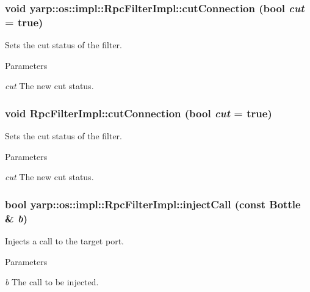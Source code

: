 \hypertarget{classyarp_1_1os_1_1impl_1_1_rpc_filter_impl_ae5de0a409d788cb9f1c910adb586c32c}{
\subsubsection[{cutConnection}]{\setlength{\rightskip}{0pt plus 5cm}void yarp::os::impl::RpcFilterImpl::cutConnection (bool {\em cut} = {\ttfamily true})}}
\label{classyarp_1_1os_1_1impl_1_1_rpc_filter_impl_ae5de0a409d788cb9f1c910adb586c32c}
Sets the cut status of the filter. 
\begin{DoxyParams}{Parameters}
\item[{\em cut}]The new cut status. \end{DoxyParams}
\hypertarget{classyarp_1_1os_1_1impl_1_1_rpc_filter_impl_a3c3f3382e223f75955459fc29bbd9e3d}{
\subsubsection[{cutConnection}]{\setlength{\rightskip}{0pt plus 5cm}void RpcFilterImpl::cutConnection (bool {\em cut} = {\ttfamily true})}}
\label{classyarp_1_1os_1_1impl_1_1_rpc_filter_impl_a3c3f3382e223f75955459fc29bbd9e3d}
Sets the cut status of the filter. 
\begin{DoxyParams}{Parameters}
\item[{\em cut}]The new cut status. \end{DoxyParams}
\hypertarget{classyarp_1_1os_1_1impl_1_1_rpc_filter_impl_a289b662c96ec6189b0ed385ff4f135cf}{
\subsubsection[{injectCall}]{\setlength{\rightskip}{0pt plus 5cm}bool yarp::os::impl::RpcFilterImpl::injectCall (const Bottle \& {\em b})}}
\label{classyarp_1_1os_1_1impl_1_1_rpc_filter_impl_a289b662c96ec6189b0ed385ff4f135cf}
Injects a call to the target port. 
\begin{DoxyParams}{Parameters}
\item[{\em b}]The call to be injected. \end{DoxyParams}
